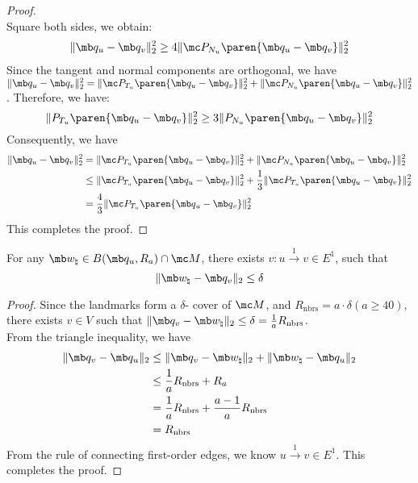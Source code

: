 \begin{proof}
\begin{equation}
\end{equation}
Square both sides, we obtain:
\begin{equation}
    \begin{aligned}
        \| \mb q_u - \mb q_v \|_2^2
        \geq 4 \| \mc P_{N_u} \paren{\mb q_u - \mb q_v} \|_2^2
    \end{aligned}
\end{equation}
Since the tangent and normal components are orthogonal, we have $ \| \mb q_u - \mb q_v \|_2^2 = \| \mc P_{T_u} \paren{\mb q_u - \mb q_v} \|_2^2 + \| \mc P_{N_u} \paren{\mb q_u - \mb q_v} \|_2^2$. Therefore, we have:
\begin{equation}
     \| P_{T_u} \paren{\mb q_u - \mb q_v} \|_2^2
     \geq 3  \| P_{N_u} \paren{\mb q_u - \mb q_v} \|_2^2
\end{equation}
Consequently, we have
\begin{equation}
    \begin{aligned}
    \| \mb q_u - \mb q_v \|_2^2
    &= \| \mc P_{T_u} \paren{\mb q_u - \mb q_v} \|_2^2 + \| \mc P_{N_u} \paren{\mb q_u - \mb q_v} \|_2^2\\
    &\leq \| \mc P_{T_u} \paren{\mb q_u - \mb q_v} \|_2^2 + \frac{1}{3}\| \mc P_{T_u} \paren{\mb q_u - \mb q_v} \|_2^2\\
    &= \frac{4}{3} \| \mc P_{T_u} \paren{\mb q_u - \mb q_v} \|_2^2
    \end{aligned}
\end{equation}
This completes the proof.
\end{proof}


\begin{lemma}\label{lem:small Euclidean ball covering} For any $\mb w_\natural \in B(\mb q_u, R_a) \cap \mc M$, there exists $v: u \overset{1}{\rightarrow} v \in E^1$, such that 
    \begin{equation}
        \| \mb w_\natural - \mb q_v \|_2 \leq \delta
    \end{equation}
\end{lemma}
\begin{proof}
    Since the landmarks form a $\delta$- cover of $\mc M$, and $R_{\text{nbrs}} = a \cdot \delta (a \geq 40)$, there exists $v \in V$ such that $\| \mb q_v - \mb w_\natural \|_2 \leq \delta = \frac{1}{a} R_{\text{nbrs}}$.  \\
    From the triangle inequality, we have
    \begin{equation}
        \begin{aligned}
            \| \mb q_v - \mb q_u \|_2
            &\leq \| \mb q_v - \mb w_\natural \|_2 + \| \mb w_\natural - \mb q_u \|_2\\
            &\leq \frac{1}{a} R_{\text{nbrs}} + R_a\\
            &= \frac{1}{a} R_{\text{nbrs}} + \frac{a-1}{a} R_{\text{nbrs}}\\
            &= R_{\text{nbrs}}
        \end{aligned}
    \end{equation}
From the rule of connecting first-order edges, we know $u \overset{1}{\rightarrow} v \in E^1$. This completes the proof.
\end{proof}

